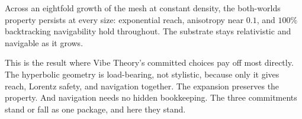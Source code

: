 \begin{result}
Across an eightfold growth of the mesh at constant density, the both-worlds property persists at every size: exponential reach, anisotropy near $0.1$, and $100\%$ backtracking navigability hold throughout. The substrate stays relativistic and navigable as it grows.
\end{result}

This is the result where Vibe Theory's committed choices pay off most directly. The hyperbolic geometry is load-bearing, not stylistic, because only it gives reach, Lorentz safety, and navigation together. The expansion preserves the property. And navigation needs no hidden bookkeeping. The three commitments stand or fall as one package, and here they stand.
